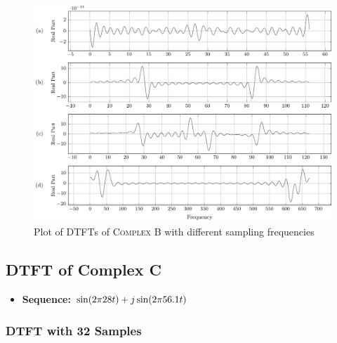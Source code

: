 \documentclass[../../course]{subfiles}
\begin{document}
\vfill

\begin{figure} [H]
    \centering
     {
        \includegraphics[height = 0.8\textheight] {tikzpics/plotDtftComplexB64.pdf}
    }
     {Plot of \textsc{DTFT}s of \textsc{Complex B} with different sampling frequencies}
    \label{plt:dtftComplexB}
\end{figure}

\pagebreak

\subsection{DTFT of Complex C} \label{ssec:dtftCplxC}

\begin{itemize} [label=]

    \item \textbf{Sequence:} $\sin(2 \pi 28 t) + j \sin(2 \pi 56.1 t)$

\end{itemize}

\subsubsection{DTFT with 32 Samples}
\end{document}
